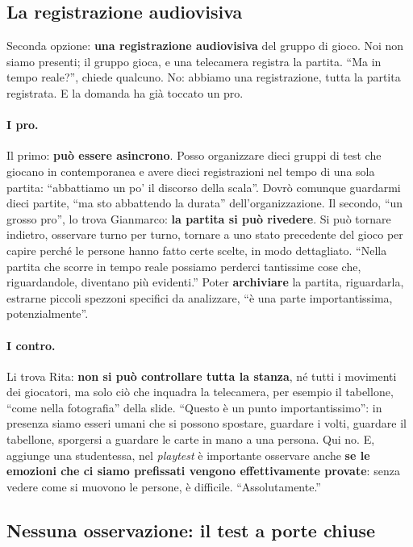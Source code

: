\subsection{La registrazione audiovisiva}

Seconda opzione: \textbf{una registrazione audiovisiva} del gruppo di gioco. Noi non siamo
presenti; il gruppo gioca, e una telecamera registra la partita. ``Ma in tempo reale?'',
chiede qualcuno. No: abbiamo una registrazione, tutta la partita registrata. E la domanda
ha già toccato un pro.

\paragraph{I pro.} Il primo: \textbf{può essere asincrono}. Posso organizzare dieci gruppi
di test che giocano in contemporanea e avere dieci registrazioni nel tempo di una sola
partita: ``abbattiamo un po' il discorso della scala''. Dovrò comunque guardarmi dieci
partite, ``ma sto abbattendo la durata'' dell'organizzazione. Il secondo, ``un grosso
pro'', lo trova Gianmarco: \textbf{la partita si può rivedere}. Si può tornare indietro,
osservare turno per turno, tornare a uno stato precedente del gioco per capire perché le
persone hanno fatto certe scelte, in modo dettagliato. ``Nella partita che scorre in
tempo reale possiamo perderci tantissime cose che, riguardandole, diventano più
evidenti.'' Poter \textbf{archiviare} la partita, riguardarla, estrarne piccoli spezzoni
specifici da analizzare, ``è una parte importantissima, potenzialmente''.

\paragraph{I contro.} Li trova Rita: \textbf{non si può controllare tutta la stanza}, né
tutti i movimenti dei giocatori, ma solo ciò che inquadra la telecamera, per esempio il
tabellone, ``come nella fotografia'' della slide. ``Questo è un punto importantissimo'':
in presenza siamo esseri umani che si possono spostare, guardare i volti, guardare il
tabellone, sporgersi a guardare le carte in mano a una persona. Qui no. E, aggiunge una
studentessa, nel \emph{playtest} è importante osservare anche \textbf{se le emozioni che
ci siamo prefissati vengono effettivamente provate}: senza vedere come si muovono le
persone, è difficile. ``Assolutamente.''

\subsection{Nessuna osservazione: il test a porte chiuse}

